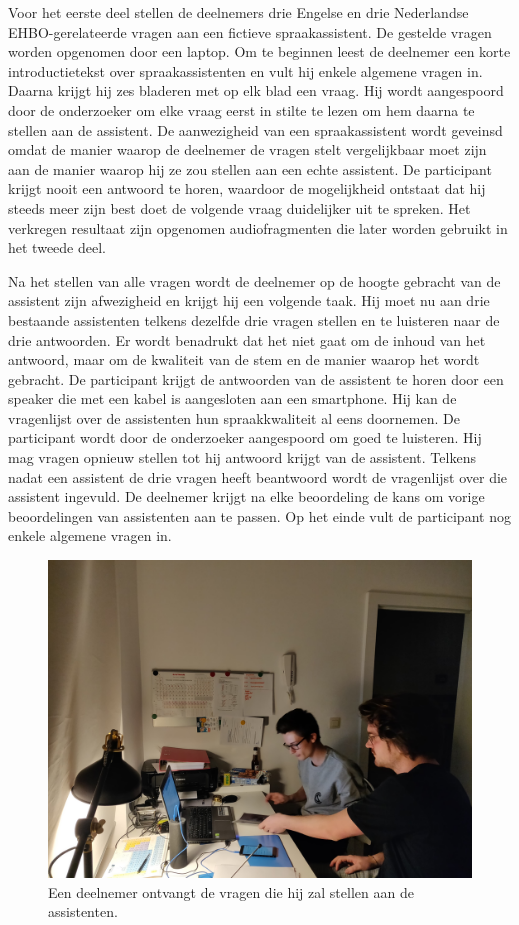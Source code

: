Voor het eerste deel stellen de deelnemers drie Engelse en drie Nederlandse EHBO-gerelateerde vragen aan een fictieve spraakassistent. De gestelde vragen worden opgenomen door een laptop.
Om te beginnen leest de deelnemer een korte introductietekst over spraakassistenten en vult hij enkele algemene vragen in. Daarna krijgt hij zes bladeren met op elk blad een vraag. Hij wordt aangespoord door de onderzoeker om elke vraag eerst in stilte te lezen om hem daarna te stellen aan de assistent. De aanwezigheid van een spraakassistent wordt geveinsd omdat de manier waarop de deelnemer de vragen stelt vergelijkbaar moet zijn aan de manier waarop hij ze zou stellen aan een echte assistent. De participant krijgt nooit een antwoord te horen, waardoor de mogelijkheid ontstaat dat hij steeds meer zijn best doet de volgende vraag duidelijker uit te spreken. Het verkregen resultaat zijn opgenomen audiofragmenten die later worden gebruikt in het tweede deel.

Na het stellen van alle vragen wordt de deelnemer op de hoogte gebracht van de assistent zijn afwezigheid en krijgt hij een volgende taak. Hij moet nu aan drie bestaande assistenten telkens dezelfde drie vragen stellen en te luisteren naar de drie antwoorden. Er wordt benadrukt dat het niet gaat om de inhoud van het antwoord, maar om de kwaliteit van de stem en de manier waarop het wordt gebracht. De participant krijgt de antwoorden van de assistent te horen door een speaker die met een kabel is aangesloten aan een smartphone. Hij kan de vragenlijst over de assistenten hun spraakkwaliteit al eens doornemen. De participant wordt door de onderzoeker aangespoord om goed te luisteren. Hij mag vragen opnieuw stellen tot hij antwoord krijgt van de assistent. Telkens nadat een assistent de drie vragen heeft beantwoord wordt de vragenlijst over die assistent ingevuld. De deelnemer krijgt na elke beoordeling de kans om vorige beoordelingen van assistenten aan te passen. Op het einde vult de participant nog enkele algemene vragen in.

\begin{figure}[h]
    \includegraphics[width=0.7\linewidth]{img/proefafname2}
    \caption{Een deelnemer ontvangt de vragen die hij zal stellen aan de assistenten.}
    \label{fig:proefafname1}
\end{figure}

